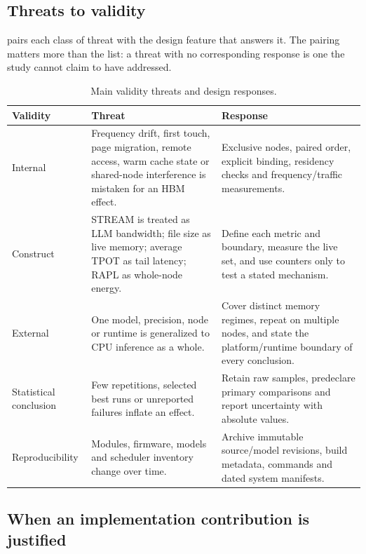 \subsection{Threats to validity}

 pairs each class of threat with the design
feature that answers it.  The pairing matters more than the list: a
threat with no corresponding response is one the study cannot claim to
have addressed.

\begin{table}[htbp]
\centering
\small
\tabsetup
\caption{Main validity threats and design responses.}
\label{tab:validity}
\begin{tabularx}{\textwidth}{@{}lYY@{}}
\toprule
\headrow
\textbf{Validity} & \textbf{Threat} & \textbf{Response} \\
\midrule
Internal
 & Frequency drift, first touch, page migration, remote access, warm
   cache state or shared-node interference is mistaken for an HBM effect.
 & Exclusive nodes, paired order, explicit binding, residency checks and
   frequency/traffic measurements. \\
Construct
 & STREAM is treated as LLM bandwidth; file size as live memory; average
   TPOT as tail latency; RAPL as whole-node energy.
 & Define each metric and boundary, measure the live set, and use
   counters only to test a stated mechanism. \\
External
 & One model, precision, node or runtime is generalized to CPU inference
   as a whole.
 & Cover distinct memory regimes, repeat on multiple nodes, and state the
   platform/runtime boundary of every conclusion. \\
Statistical conclusion
 & Few repetitions, selected best runs or unreported failures inflate an
   effect.
 & Retain raw samples, predeclare primary comparisons and report
   uncertainty with absolute values. \\
Reproducibility
 & Modules, firmware, models and scheduler inventory change over time.
 & Archive immutable source/model revisions, build metadata, commands
   and dated system manifests. \\
\bottomrule
\end{tabularx}
\end{table}


\subsection{When an implementation contribution is justified}

